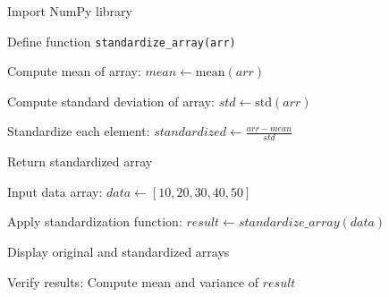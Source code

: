 \begin{algorithm}
\caption{Standardize a NumPy Array (Mean = 0, Variance = 1)}
\begin{algorithmic}[1]

\STATE Import NumPy library

\STATE Define function \texttt{standardize\_array(arr)}

\STATE Compute mean of array:
\STATE $mean \gets \text{mean}(arr)$

\STATE Compute standard deviation of array:
\STATE $std \gets \text{std}(arr)$

\STATE Standardize each element:
\STATE $standardized \gets \frac{arr - mean}{std}$

\STATE Return standardized array

\STATE Input data array:
\STATE $data \gets [10, 20, 30, 40, 50]$

\STATE Apply standardization function:
\STATE $result \gets standardize\_array(data)$

\STATE Display original and standardized arrays

\STATE Verify results:
\STATE Compute mean and variance of $result$

\end{algorithmic}
\end{algorithm}